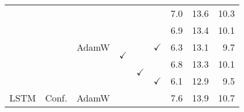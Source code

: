 \documentclass[a4paper]{article}
\begin{document}
\begin{table}
\begin{tabular}{|@{}c@{}|@{}c@{}|@{}c@{}|@{}c@{}|@{}c@{}|@{}c@{}|c|c|@{}c@{}|}
         &           & \multirow{5}{*}{AdamW} &              &              &              &   7.0      &  13.6      & 10.3 \\ \cline{4-4}\cline{7-9}
         &           &           & \multirow{4}{*}{$\checkmark$} &              &              &   6.9      &  13.4      & 10.1 \\ \cline{6-9}
         &           &           &              &              & $\checkmark$ &   6.3      &  13.1      & \textcolor{white}{0}9.7 \\ \cline{5-9}
         &           &           &              & \multirow{2}{*}{$\checkmark$} &              &   6.8      &  13.3      & 10.1 \\ \cline{6-9}
         &           &           &              &              & $\checkmark$ &   6.1      &  12.9      & \textcolor{white}{0}9.5 \\
\hline
\hline
 LSTM    &   Conf.   &  AdamW    &              &              &              &   7.6      &  13.9      & 10.7 \\
\hline
\end{tabular}                              
\label{tab:comp_lstm_conf}
\vspace{-2mm}
\end{table}

\vspace{-1.5mm}
\end{document}
